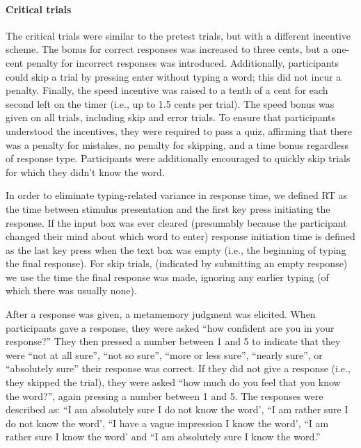 
\paragraph{Critical trials} The critical trials were similar to the pretest trials, but with a different incentive scheme. The bonus for correct responses was increased to three cents, but a one-cent penalty for incorrect responses was introduced. Additionally, participants could skip a trial by pressing enter without typing a word; this did not incur a penalty. Finally, the speed incentive was raised to a tenth of a cent for each second left on the timer (i.e., up to 1.5 cents per trial). The speed bonus was given on all trials, including skip and error trials. To ensure that participants understood the incentives, they were required to pass a quiz, affirming that there was a penalty for mistakes, no penalty for skipping, and a time bonus regardless of response type. Participants were additionally encouraged to quickly skip trials for which they didn't know the word.

In order to eliminate typing-related variance in response time, we defined RT as the time between stimulus presentation and the first key press initiating the response. If the input box was ever cleared (presumably because the participant changed their mind about which word to enter) response initiation time is defined as the last key press when the text box was empty (i.e., the beginning of typing the final response). For skip trials, (indicated by submitting an empty response) we use the time the final response was made, ignoring any earlier typing (of which there was usually none).

After a response was given, a metamemory judgment was elicited. When participants gave a response, they were asked ``how confident are you in your response?'' They then pressed a number between 1 and 5 to indicate that they were ``not at all sure'', ``not so sure'', ``more or less sure'', ``nearly sure'', or ``absolutely sure'' their response was correct. If they did not give a response (i.e., they skipped the trial), they were asked ``how much do you feel that you know the word?'', again pressing a number between 1 and 5. The responses were described as: ``I am absolutely sure I do not know the word', ``I am rather sure I do not know the word', ``I have a vague impression I know the word', ``I am rather sure I know the word' and ``I am absolutely sure I know the word.'' 


